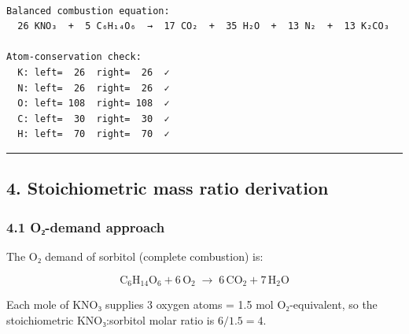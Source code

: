 \documentclass[11pt]{article}
\begin{document}
    \begin{Verbatim}[commandchars=\\\{\}]

Balanced combustion equation:
  26 KNO₃  +  5 C₆H₁₄O₆  →  17 CO₂  +  35 H₂O  +  13 N₂  +  13 K₂CO₃

Atom-conservation check:
  K: left=  26  right=  26  ✓
  N: left=  26  right=  26  ✓
  O: left= 108  right= 108  ✓
  C: left=  30  right=  30  ✓
  H: left=  70  right=  70  ✓
    \end{Verbatim}

    \begin{center}\rule{0.5\linewidth}{0.5pt}\end{center}

\subsection{4. Stoichiometric mass ratio
derivation}\label{stoichiometric-mass-ratio-derivation}

\subsubsection{4.1 O₂-demand approach}\label{oux2082-demand-approach}

The O₂ demand of sorbitol (complete combustion) is:

\[
\text{C}_6\text{H}_{14}\text{O}_6 + 6\,\text{O}_2
\;\rightarrow\;
6\,\text{CO}_2 + 7\,\text{H}_2\text{O}
\]

Each mole of KNO₃ supplies 3 oxygen atoms = 1.5 mol O₂-equivalent, so
the stoichiometric KNO₃:sorbitol molar ratio is \(6 / 1.5 = 4\).
\end{document}
